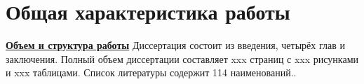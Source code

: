 \section*{Общая характеристика работы}
\newcommand{\actuality}{\pdfbookmark[1]{Актуальность}{actuality}\underline{\textbf{\actualityTXT}}}
\newcommand{\progress}{\pdfbookmark[1]{Разработанность темы}{progress}\underline{\textbf{\progressTXT}}}
\newcommand{\aim}{\pdfbookmark[1]{Цели}{aim}\underline{{\textbf\aimTXT}}}
\newcommand{\tasks}{\pdfbookmark[1]{Задачи}{tasks}\underline{\textbf{\tasksTXT}}}
\newcommand{\aimtasks}{\pdfbookmark[1]{Цели и задачи}{aimtasks}\aimtasksTXT}
\newcommand{\compliance}{\pdfbookmark[1]{Соответствие паспорту специальности}{compliance}\underline{\textbf{\complianceTXT}}}
\newcommand{\novelty}{\pdfbookmark[1]{Научная новизна}{novelty}\underline{\textbf{\noveltyTXT}}}
\newcommand{\influence}{\pdfbookmark[1]{Практическая значимость}{influence}\underline{\textbf{\influenceTXT}}}
\newcommand{\methods}{\pdfbookmark[1]{Методология и методы исследования}{methods}\underline{\textbf{\methodsTXT}}}
\newcommand{\defpositions}{\pdfbookmark[1]{Положения, выносимые на защиту}{defpositions}\underline{\textbf{\defpositionsTXT}}}
\newcommand{\reliability}{\pdfbookmark[1]{Достоверность}{reliability}\underline{\textbf{\reliabilityTXT}}}
\newcommand{\probation}{\pdfbookmark[1]{Апробация}{probation}\underline{\textbf{\probationTXT}}}
\newcommand{\contribution}{\pdfbookmark[1]{Личный вклад}{contribution}\underline{\textbf{\contributionTXT}}}
\newcommand{\publications}{\pdfbookmark[1]{Публикации}{publications}\underline{\textbf{\publicationsTXT}}}




\underline{\textbf{Объем и структура работы}} Диссертация состоит из введения, четырёх глав и заключения. Полный объем диссертации составляет xxx страниц с xxx рисунками и xxx таблицами. Список литературы содержит 114 наименований..

